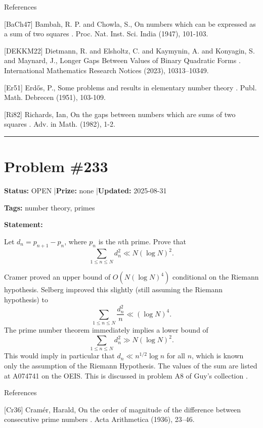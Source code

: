 \documentclass{article}
\begin{document}
References

[BaCh47] Bambah, R. P. and Chowla, S., On numbers which can be expressed as a sum of two squares . Proc. Nat. Inst. Sci. India (1947), 101-103.

[DEKKM22] Dietmann, R. and Elsholtz, C. and Kaymynin, A. and Konyagin, S. and Maynard, J., Longer Gaps Between Values of Binary Quadratic Forms . International Mathematics Research Notices (2023), 10313–10349.

[Er51] Erd\H{o}s, P., Some problems and results in elementary number theory . Publ. Math. Debrecen (1951), 103-109.

[Ri82] Richards, Ian, On the gaps between numbers which are sums of two squares . Adv. in Math. (1982), 1-2.

\noindent\rule{\linewidth}{0.4pt}


\section{Problem \#233}
\label{prob:233}

\noindent\textbf{Status:} OPEN \quad|\quad \textbf{Prize:} none \quad|\quad \textbf{Updated:} 2025-08-31

\noindent\textbf{Tags:} number theory, primes

\medskip

\noindent\textbf{Statement:}

Let $d_n=p_{n+1}-p_n$, where $p_n$ is the $n$th prime. Prove that\[\sum_{1\leq n\leq N}d_n^2 \ll N(\log N)^2.\]




Cramer \cite{Cr36} proved an upper bound of $O(N(\log N)^4)$ conditional on the Riemann hypothesis. Selberg \cite{Se43} improved this slightly (still assuming the Riemann hypothesis) to\[\sum_{1\leq n\leq N}\frac{d_n^2}{n}\ll (\log N)^4.\]The prime number theorem immediately implies a lower bound of\[\sum_{1\leq n\leq N}d_n^2\gg N(\log N)^2.\]This would imply in particular that $d_n\ll n^{1/2}\log n$ for all $n$, which is known only the assumption of the Riemann Hypothesis. The values of the sum are listed at A074741 on the OEIS. This is discussed in problem A8 of Guy's collection \cite{Gu04}.




References

[Cr36] Cram\'{e}r, Harald, On the order of magnitude of the difference between consecutive prime numbers . Acta Arithmetica (1936), 23--46.
\end{document}
